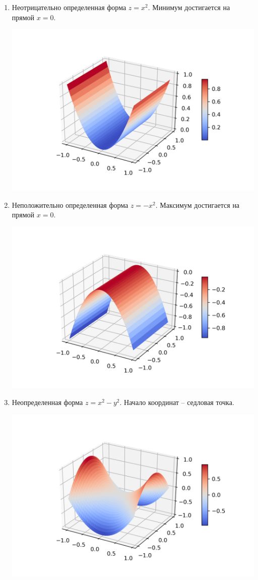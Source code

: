\begin{enumerate}
\item Неотрицательно определенная форма $z = x^2$.
Минимум достигается на прямой $ x = 0$.

\includegraphics[scale = 0.5]{Figures/graph_non_negative.png}

\item Неположительно определенная форма $z = - x^2$.
Максимум достигается на прямой $x = 0$.

\includegraphics[scale = 0.5]{Figures/graph_non_positive.png}

\item Неопределенная форма $z = x^2 - y^2$.
Начало координат -- седловая точка.

\includegraphics[scale = 0.5]{Figures/graph_saddle.png}
\end{enumerate}


